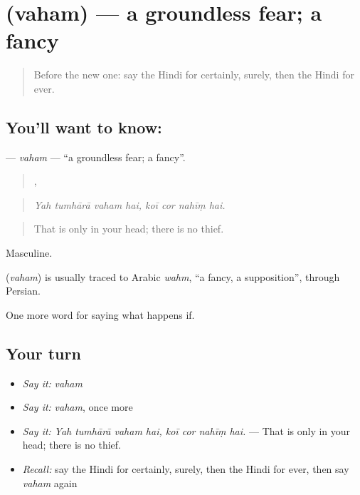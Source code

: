 \section[\texorpdfstring{\hi{वहम} (vaham)}{वहम (vaham)}]{ (vaham) — a groundless fear; a fancy}

\label{lesson:HI-C556-vaham}



\begin{quote}
Before the new one: say the Hindi for certainly, surely, then the Hindi for ever.
\end{quote}

\subsection*{You'll want to know: }
\textbf{} — \emph{vaham} — \textquotedblleft{}a groundless fear; a fancy\textquotedblright{}.

\begin{quote}
   ,    
\end{quote}

\begin{quote}
\emph{Yah tumhārā vaham hai, koī cor nahīṃ hai.}
\end{quote}

\begin{quote}
That is only in your head; there is no thief.
\end{quote}

Masculine.

\begin{cousinweb}
\textbf{} (\emph{vaham}) is usually traced to Arabic \emph{wahm}, \textquotedblleft{}a fancy, a supposition\textquotedblright{}, through Persian.
\end{cousinweb}

\begin{grammarlens}[title={What you've built}]
One more word for saying what happens if.
\end{grammarlens}

\subsection*{Your turn}
\begin{itemize}
\raggedright
  \item \emph{Say it:} \emph{vaham}
  \item \emph{Say it:} \emph{vaham}, once more
  \item \emph{Say it:} \emph{Yah tumhārā vaham hai, koī cor nahīṃ hai.} — That is only in your head; there is no thief.
  \item \emph{Recall:} say the Hindi for certainly, surely, then the Hindi for ever, then say \emph{vaham} again
\end{itemize}

